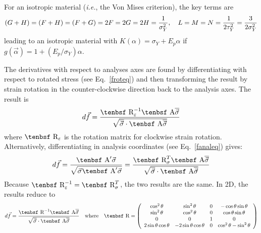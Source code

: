 \documentclass[11pt]{article}
\def\A{\hbox{\tenbsf A}}
\def\df{d \vec{f}}
\def\R{\hbox{\tenbsf R}}
\def\s#1{\sigma_{#1}}
\begin{document}
For an isotropic material ({\em i.e.}, the Von Mises criterion), the key terms are
\begin{equation}
   (G+H) = (F+H) = (F+G) = 2F = 2G = 2H = {1\over \sigma_Y^2}, \quad L=M=N = {1\over 2\tau_Y^2} = {3\over 2\sigma_Y^2}
\end{equation}
leading to an isotropic material with $K(\alpha)=\sigma_Y + E_p\alpha$ if $g(\vec\alpha) = 1 + (E_p/\sigma_Y)\alpha$.

The derivatives with respect to analyses axes are found by differentiating with respect to rotated stress (see Eq.~\ref{froteq}) and then transforming the result by strain rotation in the counter-clockwise direction back to the analysis axes. The result is
\begin{equation}
         \df = {\R_\varepsilon^{-1}\A \overline{\vec\s{}}\over\sqrt{\overline{\vec\s{}} \cdot \A \overline{\vec\s{}}}} \end{equation}
where $\R_\varepsilon$ is the rotation matrix for clockwise strain rotation. Alternatively, differentiating in analysis coordinates (see Eq.~\ref{fanaleq}) gives:
\begin{equation}
   \df = {\A' \vec\s{}\over\sqrt{\vec\s{} \A' \vec\s{}}}  = {\R_\sigma^T\A \overline{\vec\s{}}\over\sqrt{\overline{\vec\s{}} \cdot \A \overline{\vec\s{}}}} 
\end{equation}
Because $\R_\varepsilon^{-1} = \R_\sigma^T$, the two results are the same. In 2D, the results reduce to
\begin{equation}
         \df = {\R^{-1}\A \overline{\vec\s{}}\over\sqrt{\overline{\vec\s{}} \cdot \A \overline{\vec\s{}}}}    \quad{\rm where}\quad
         \R = \left( \begin{array}{cccc}
                       \cos^2\theta & \sin^2\theta & 0 & -\cos\theta\sin\theta \\
                       \sin^2\theta & \cos^2\theta & 0 & \cos\theta\sin\theta \\
                       0 & 0 & 1 & 0 \\
                       2\sin\theta\cos\theta & -2\sin\theta\cos\theta & 0 & \cos^2\theta - \sin^2\theta
                       \end{array} \right)
\end{equation}
\end{document}
